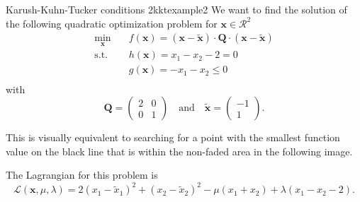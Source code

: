\begin{example}{Karush-Kuhn-Tucker conditions 2}{kktexample2}
    We want to find the solution of the following quadratic optimization problem for $\mathbf{x} \in \mathcal{R}^2$
    \begin{equation}
        \begin{aligned}
            \min_{\mathbf{x}} \quad & f(\mathbf{x})= (\mathbf{x}-\tilde{\mathbf{x}}) \cdot \mathbf{Q} \cdot (\mathbf{x}-\tilde{\mathbf{x}})\\
            \textrm{s.t.} \quad     & h(\mathbf{x}) = x_1 - x_2 - 2 = 0  \\
                          \quad     & g(\mathbf{x}) = -x_1 - x_2 \le 0  \\
        \end{aligned}
    \end{equation}
    with 
    \begin{equation}
        \mathbf{Q} = 
        \begin{pmatrix}
        2 & 0 \\
        0 & 1 
        \end{pmatrix} 
        \quad 
        \text{and}
        \quad
        \tilde{\mathbf{x}} = 
        \begin{pmatrix}
        -1\\
        1 
        \end{pmatrix}.
    \end{equation}

    This is visually equivalent to searching for a point with the smallest function value on the black line that is within the non-faded area in the following image.
    \begin{center}
        
    \end{center}

    The Lagrangian for this problem is 
    \begin{equation}
        \mathcal{\mathcal{L}}(\mathbf{x}, \mu, \lambda) = 2 (x_1-\tilde{x}_1)^2 + (x_2-\tilde{x}_2)^2 - \mu (x_1+x_2) + \lambda (x_1 - x_2 -2).
    \end{equation}


\end{example}
